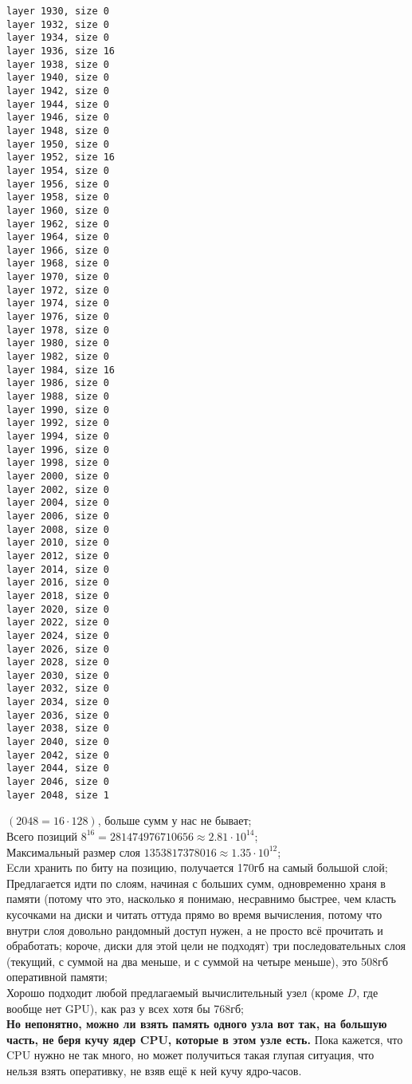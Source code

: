 \documentclass[12pt]{article}
\begin{document}
\begin{verbatim}
layer 1930, size 0
layer 1932, size 0
layer 1934, size 0
layer 1936, size 16
layer 1938, size 0
layer 1940, size 0
layer 1942, size 0
layer 1944, size 0
layer 1946, size 0
layer 1948, size 0
layer 1950, size 0
layer 1952, size 16
layer 1954, size 0
layer 1956, size 0
layer 1958, size 0
layer 1960, size 0
layer 1962, size 0
layer 1964, size 0
layer 1966, size 0
layer 1968, size 0
layer 1970, size 0
layer 1972, size 0
layer 1974, size 0
layer 1976, size 0
layer 1978, size 0
layer 1980, size 0
layer 1982, size 0
layer 1984, size 16
layer 1986, size 0
layer 1988, size 0
layer 1990, size 0
layer 1992, size 0
layer 1994, size 0
layer 1996, size 0
layer 1998, size 0
layer 2000, size 0
layer 2002, size 0
layer 2004, size 0
layer 2006, size 0
layer 2008, size 0
layer 2010, size 0
layer 2012, size 0
layer 2014, size 0
layer 2016, size 0
layer 2018, size 0
layer 2020, size 0
layer 2022, size 0
layer 2024, size 0
layer 2026, size 0
layer 2028, size 0
layer 2030, size 0
layer 2032, size 0
layer 2034, size 0
layer 2036, size 0
layer 2038, size 0
layer 2040, size 0
layer 2042, size 0
layer 2044, size 0
layer 2046, size 0
layer 2048, size 1
\end{verbatim}
\normalsize
$(2048 = 16 \cdot 128)$, больше сумм у нас не бывает;\\
Всего позиций $8^{16} = 281474976710656 \approx 2.81 \cdot 10^{14}$;\\
Максимальный размер слоя $1353817378016 \approx 1.35 \cdot 10^{12}$;\\
Eсли хранить по биту на позицию, получается 170гб на самый большой слой;\\
Предлагается идти по слоям, начиная с больших сумм, одновременно храня в памяти (потому что это, насколько я понимаю, несравнимо быстрее, чем класть кусочками на диски и читать оттуда прямо во время вычисления, потому что внутри слоя довольно рандомный доступ нужен, а не просто всё прочитать и обработать; короче, диски для этой цели не подходят) три последовательных слоя (текущий, с суммой на два меньше, и с суммой на четыре меньше), это 508гб оперативной памяти;\\
Хорошо подходит любой предлагаемый вычислительный узел (кроме $D$, где вообще нет GPU), как раз у всех хотя бы 768гб;\\
\textbf{Но непонятно, можно ли взять память одного узла вот так, на большую часть, не беря кучу ядер CPU, которые в этом узле есть.} Пока кажется, что CPU нужно не так много, но может получиться такая глупая ситуация, что нельзя взять оперативку, не взяв ещё к ней кучу ядро-часов.\\
\end{document}
